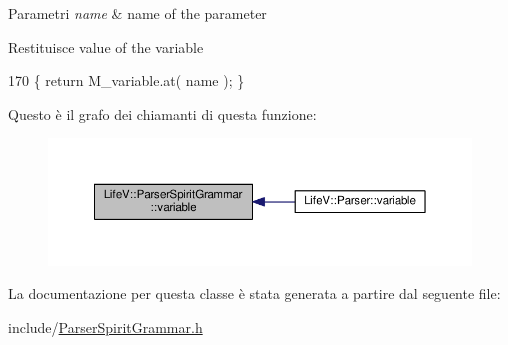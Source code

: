 \begin{DoxyParams}{Parametri}
{\em name} & name of the parameter \\
\hline
\end{DoxyParams}
\begin{DoxyReturn}{Restituisce}
value of the variable 
\end{DoxyReturn}

\begin{DoxyCode}
170 \{ \textcolor{keywordflow}{return} M\_variable.at( name ); \}
\end{DoxyCode}


Questo è il grafo dei chiamanti di questa funzione\-:
\nopagebreak
\begin{figure}[H]
\begin{center}
\leavevmode
\includegraphics[width=350pt]{classLifeV_1_1ParserSpiritGrammar_a768e48421db190a4eba5144932ddc4f6_icgraph}
\end{center}
\end{figure}




La documentazione per questa classe è stata generata a partire dal seguente file\-:\begin{DoxyCompactItemize}
\item 
include/\hyperlink{ParserSpiritGrammar_8h}{Parser\-Spirit\-Grammar.\-h}\end{DoxyCompactItemize}
